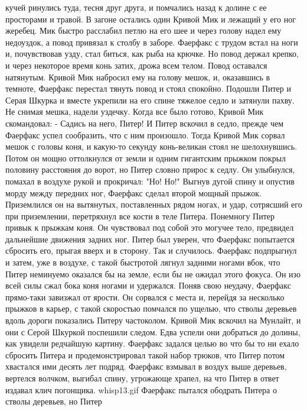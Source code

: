 кучей ринулись туда, тесня друг друга, и помчались назад к долине с ее 
просторами и травой.
    В загоне остались один Кривой Мик и лежащий у его ног жеребец. Мик 
быстро расслабил петлю на его шее и через голову надел ему недоуздок, 
а повод привязал к столбу в заборе. Фаерфакс с трудом встал на ноги и, 
почувствовав узду, стал биться, как рыба на крючке. Но повод держал 
крепко, и через некоторое время конь затих, дрожа всем телом. Повод 
оставался натянутым.
    Кривой Мик набросил ему на голову мешок, и, оказавшись в темноте, 
Фаерфакс перестал тянуть повод и стоял спокойно.
    Подошли Питер и Серая Шкурка и вместе укрепили на его спине 
тяжелое седло и затянули пахву. Не снимая мешка, надели уздечку. Когда 
все было готово, Кривой Мик скомандовал:
    - Садись на него, Питер!
    И Питер вскочил в седло, прежде чем Фаерфакс успел сообразить, что 
с ним произошло.
    Тогда Кривой Мик сорвал мешок с головы коня, и какую-то секунду 
конь-великан стоял не шелохнувшись. Потом он мощно оттолкнулся от 
земли и одним гигантским прыжком покрыл половину расстояния до ворот, 
но Питер словно прирос к седлу. Он улыбнулся, помахал в воздухе рукой 
и прокричал: "Но! Но!" Выгнув дугой спину и опустив морду между 
передних ног, Фаерфакс сделал второй мощный прыжок. Приземлился он на 
вытянутых, поставленных рядом ногах, и удар, сотрясший его при 
приземлении, перетряхнул все кости в теле Питера.
    Понемногу Питер привык к прыжкам коня. Он чувствовал под собой это 
могучее тело, предвидел дальнейшие движения задних ног. Питер был 
уверен, что Фаерфакс попытается сбросить его, прыгая вверх и в 
сторону. Так и случилось. Фаерфакс подпрыгнул и затем, уже в воздухе, 
с такой быстротой лягнул задними ногами вбок, что Питер неминуемо 
оказался бы на земле, если бы не ожидал этого фокуса. Он изо всей силы 
сжал бока коня ногами и удержался.
    Поняв свою неудачу, Фаерфакс прямо-таки завизжал от ярости. Он 
сорвался с места и, перейдя за несколько прыжков в карьер, с такой 
скоростью помчался по ущелью, что стволы деревьев вдоль дороги 
показались Питеру частоколом.
    Кривой Мик вскочил на Мунлайт, и они с Серой Шкуркой поспешили 
следом. Едва успели они добраться до долины, как увидели редчайшую 
картину. Фаерфакс задался целью во что бы то ни ехало сбросить Питера 
и продемонстрировал такой набор трюков, что Питер потом хвастался ими 
десять лет подряд. Фаерфакс взмывал в воздух выше деревьев, вертелся 
волчком, выгибал спину, угрожающе храпел, на что Питер в ответ издавал 
клич погонщика.
    {whisp13.gif}
    Фаерфакс пытался ободрать Питера о стволы деревьев, но Питер 
